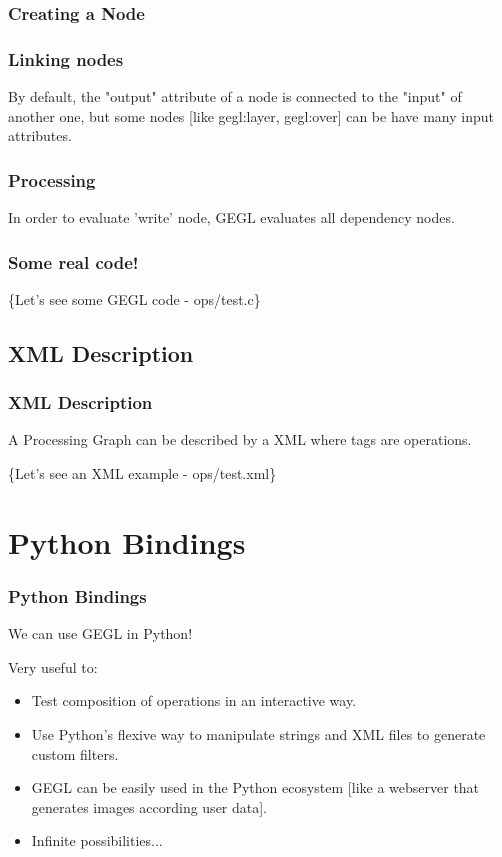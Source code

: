 \documentclass{beamer}
\begin{document}
\begin{frame}
  \frametitle{Creating a Node}
  
\end{frame}

\begin{frame}
  \frametitle{Linking nodes}
  

  By default, the "output" attribute of a node is connected to the
  "input" of another one, but some nodes [like gegl:layer, gegl:over]
  can be have many input attributes.
\end{frame}

\begin{frame}
  \frametitle{Processing}
  

  In order to evaluate 'write' node, GEGL evaluates all dependency nodes.
\end{frame}

\begin{frame}
  \frametitle{Some real code!}

  \{Let's see some GEGL code - ops/test.c\}
\end{frame}

\subsection{XML Description}

\begin{frame}
  \frametitle{XML Description}
  A Processing Graph can be described by a XML where tags are
  operations.

  \{Let's see an XML example - ops/test.xml\}
\end{frame}

\section{Python Bindings}

\begin{frame}
  \frametitle{Python Bindings}
  We can use GEGL in Python!

  Very useful to:
  \pause
  \begin{itemize}
    \item{Test composition of operations in an interactive way.}
    \pause
    \item{Use Python's flexive way to manipulate strings and XML files to generate custom filters.}
    \pause
    \item{GEGL can be easily used in the Python ecosystem [like a webserver that generates images according user data].}
    \pause
    \item{Infinite possibilities...}
  \end{itemize}
\end{frame}
\end{document}
